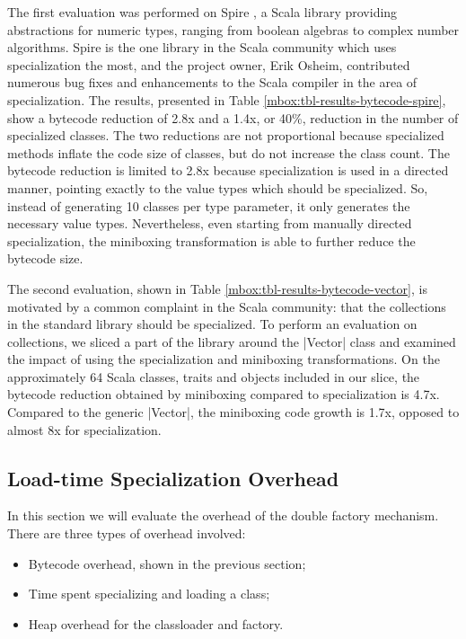 The first evaluation was performed on Spire \cite{erik-spire}, a Scala library providing abstractions for numeric types, ranging from boolean algebras to complex number algorithms. Spire is the one library in the Scala community which uses specialization the most, and the project owner, Erik Osheim, contributed numerous bug fixes and enhancements to the Scala compiler in the area of specialization. The results, presented in Table \ref{mbox:tbl-results-bytecode-spire}, show a bytecode reduction of 2.8x and a 1.4x, or 40\%, reduction in the number of specialized classes. The two reductions are not proportional because specialized methods inflate the code size of classes, but do not increase the class count. The bytecode reduction is limited to 2.8x because specialization is used in a directed manner, pointing exactly to the value types which should be specialized. So, instead of generating 10 classes per type parameter, it only generates the necessary value types. Nevertheless, even starting from manually directed specialization, the miniboxing transformation is able to further reduce the bytecode size.

The second evaluation, shown in Table \ref{mbox:tbl-results-bytecode-vector}, is motivated by a common complaint in the Scala community: that the collections in the standard library should be specialized. To perform an evaluation on collections, we sliced a part of the library around the |Vector| class and examined the impact of using the specialization and miniboxing transformations. On the approximately 64 Scala classes, traits and objects included in our slice, the bytecode reduction obtained by miniboxing compared to specialization is 4.7x. Compared to the generic |Vector|, the miniboxing code growth is 1.7x, opposed to almost 8x for specialization.


\subsection{Load-time Specialization Overhead}
\label{mbox:subsec-eval-specialization}

In this section we will evaluate the overhead of the double factory mechanism. There are three types of overhead involved:
\begin{itemize}
  \item Bytecode overhead, shown in the previous section;
  \item Time spent specializing and loading a class;
  \item Heap overhead for the classloader and factory.
\end{itemize}

